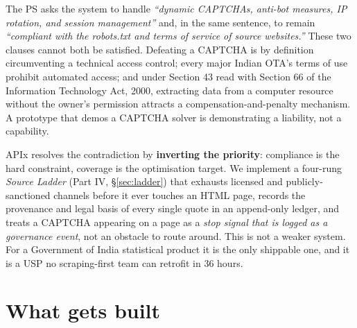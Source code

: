 \begin{warnbox}
The PS asks the system to handle \emph{``dynamic CAPTCHAs, anti-bot measures, IP
rotation, and session management''} and, in the same sentence, to remain \emph{``compliant
with the robots.txt and terms of service of source websites.''} These two clauses cannot
both be satisfied. Defeating a CAPTCHA is by definition circumventing a technical access
control; every major Indian OTA's terms of use prohibit automated access; and under
Section 43 read with Section 66 of the Information Technology Act, 2000, extracting data
from a computer resource without the owner's permission attracts a compensation-and-penalty
mechanism. A prototype that demos a CAPTCHA solver is demonstrating a liability, not a
capability.
\end{warnbox}

\noindent APIx resolves the contradiction by \textbf{inverting the priority}: compliance is
the hard constraint, coverage is the optimisation target. We implement a four-rung
\emph{Source Ladder} (Part IV, \S\ref{sec:ladder}) that exhausts licensed and
publicly-sanctioned channels before it ever touches an HTML page, records the provenance
and legal basis of every single quote in an append-only ledger, and treats a CAPTCHA
appearing on a page as a \emph{stop signal that is logged as a governance event}, not an
obstacle to route around. This is not a weaker system. For a Government of India
statistical product it is the only shippable one, and it is a USP no scraping-first team
can retrofit in 36 hours.

\section{What gets built}


